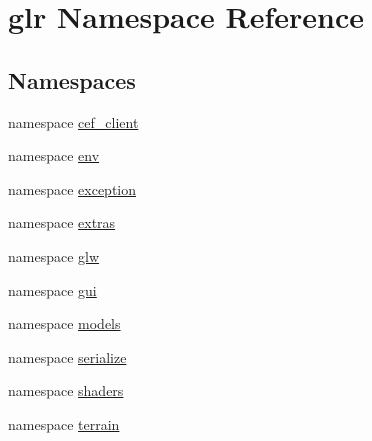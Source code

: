 \hypertarget{namespaceglr}{\section{glr Namespace Reference}
\label{namespaceglr}
}
\subsection*{Namespaces}
\begin{DoxyCompactItemize}
\item 
namespace \hyperlink{namespaceglr_1_1cef__client}{cef\-\_\-client}
\item 
namespace \hyperlink{namespaceglr_1_1env}{env}
\item 
namespace \hyperlink{namespaceglr_1_1exception}{exception}
\item 
namespace \hyperlink{namespaceglr_1_1extras}{extras}
\item 
namespace \hyperlink{namespaceglr_1_1glw}{glw}
\item 
namespace \hyperlink{namespaceglr_1_1gui}{gui}
\item 
namespace \hyperlink{namespaceglr_1_1models}{models}
\item 
namespace \hyperlink{namespaceglr_1_1serialize}{serialize}
\item 
namespace \hyperlink{namespaceglr_1_1shaders}{shaders}
\item 
namespace \hyperlink{namespaceglr_1_1terrain}{terrain}
\end{DoxyCompactItemize}
